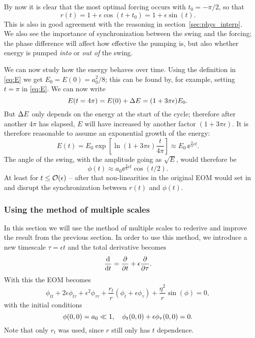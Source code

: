 By now it is clear that the most optimal forcing occurs with
$t_0=-\pi/2$, so that
\begin{equation}\label{eq:r}
r(t)=1+\epsilon\cos(t+t_0)=1+\epsilon\sin(t).
\end{equation}
This is also in good agreement with the reasoning in
section~\ref{sec:phys_interp}. We also see the importance of
synchronization between the swing and the forcing; the phase
difference will affect how effective the pumping is, but also whether
energy is pumped \emph{into} or \emph{out of} the swing.

We can now study how the energy behaves over time. Using the
definition in \eqref{eq:E} we get $E_0=E(0)=a_0^2/8$; this can be
found by, for example, setting $t=\pi$ in \eqref{eq:E}. We can now write
\begin{equation}\label{eq:E(4pi)}
E(t=4\pi)=E(0)+\Delta{E}=(1+3\pi\epsilon)E_0.
\end{equation}
But $\Delta{E}$ only depends on the energy at the start of the cycle;
therefore after another $4\pi$ has elapsed, $E$ will have increased by
another factor $(1+3\pi\epsilon)$. 
It is therefore reasonable to assume an exponential growth of the
energy: 
\begin{equation}\label{eq:E(t)}
E(t)=E_0\exp[\ln(1+3\pi\epsilon)\frac{t}{4\pi}]
\approx E_0\,\ee^{\frac{3}{4}\epsilon t}.
\end{equation}
The angle of the swing, with the amplitude going as
$\sqrt{E}$, would therefore be 
\begin{equation}\label{eq:phi_from_E}
\phi(t)\approx a_0\ee^{\frac{3}{8}\epsilon t}\cos(t/2).
\end{equation}
At least for $t\le\order{\epsilon}$ -- after that non-linearities in the
original EOM would set in and disrupt the synchronization between $r(t)$ and
$\phi(t)$. 



\subsubsection{Using the method of multiple scales}

In this section we will use the method of multiple scales to
rederive and improve the result from the previous section. In order to
use this method, we introduce a new timescale $\tau=\epsilon{t}$ and
the total derivative becomes
\begin{equation}
\dv{t}=\pdv{t}+\epsilon\pdv{\tau}.
\end{equation}
With this the EOM becomes
\begin{equation}\label{eq:eom_mms}
\phi_{tt}+2\epsilon\phi_{t\tau}+\epsilon^2\phi_{\tau\tau}
+\frac{r_t}{r}(\phi_t+\epsilon\phi_\tau)+\frac{\eta^2}{r}\sin(\phi)=0,
\end{equation}
with the initial conditions 
\begin{equation}\label{eq:inti_mms}
\phi(0, 0)=a_0\ll1\qcomma
\phi_t(0, 0)+\epsilon\phi_\tau(0, 0)=0.
\end{equation} 
Note that only $r_t$ was used, since $r$ still only has $t$
dependence. 

